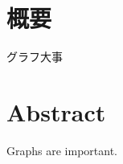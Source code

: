 \chapter*{概要}
グラフ大事

\begingroup
\renewcommand{\cleardoublepage}{}
\renewcommand{\clearpage}{}
\chapter*{Abstract}
\endgroup
Graphs are important.
